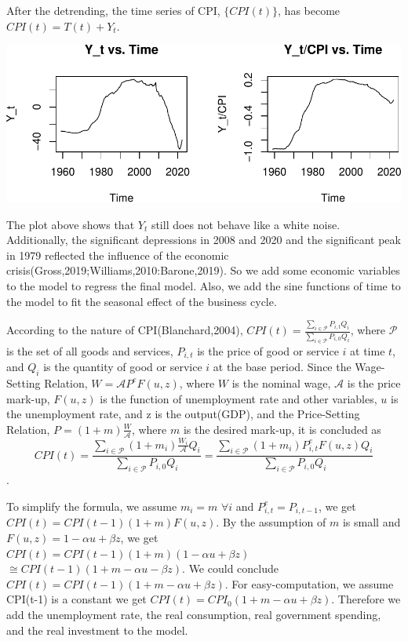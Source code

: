 \documentclass[
  man,floatsintext,
  man]{apa6}
\begin{document}
After the detrending, the time series of CPI, \(\{CPI(t)\}\), has become \(CPI(t) = T(t) + Y_t\).

\includegraphics{stat429_group2_final_proj_files/figure-latex/unnamed-chunk-2-1.pdf}

The plot above shows that \(Y_t\) still does not behave like a white noise.
Additionally, the significant depressions in 2008 and 2020 and the significant peak in 1979 reflected the influence of the economic crisis(Gross,2019;Williams,2010:Barone,2019).
So we add some economic variables to the model to regress the final model.
Also, we add the sine functions of time to the model to fit the seasonal effect of the business cycle.

According to the nature of CPI(Blanchard,2004), \(CPI(t) = \frac{\sum_{i \in \mathcal{P}} P_{i,t} Q_i}{\sum_{i \in \mathcal{P}} P_{i,0} Q_i}\), where \(\mathcal{P}\) is the set of all goods and services, \(P_{i,t}\) is the price of good or service \(i\) at time \(t\), and \(Q_i\) is the quantity of good or service \(i\) at the base period.
Since the Wage-Setting Relation, \(W = \mathcal{A} P^e F(u,z)\), where \(W\) is the nominal wage, \(\mathcal{A}\) is the price mark-up, \(F(u,z)\) is the function of unemployment rate and other variables, \(u\) is the unemployment rate, and z is the output(GDP), and the Price-Setting Relation, \(P = (1+m)\frac{W}{\mathcal{A}}\), where \(m\) is the desired mark-up,
it is concluded as
\[CPI(t) = \frac{\sum_{i \in \mathcal{P}} (1+m_i) \frac{W_i}{\mathcal{A}} Q_i}{\sum_{i \in \mathcal{P}} P_{i,0} Q_i} = \frac{\sum_{i \in \mathcal{P}} (1+m_i) P_{i,t}^e F(u,z) Q_i}{\sum_{i \in \mathcal{P}} P_{i,0} Q_i}\].

To simplify the formula, we assume \(m_i = m \,\, \forall i\) and \(P_{i,t}^e = P_{i,t-1}\), we get \(CPI(t) = CPI(t-1) (1+m) F(u,z)\).
By the assumption of \(m\) is small and \(F(u,z) = 1 - \alpha u + \beta z\), we get \(CPI(t) = CPI(t-1) (1+m) (1 - \alpha u + \beta z)\) \(\cong CPI(t-1) ( 1 + m - \alpha u - \beta z)\).
We could conclude \(CPI(t)=CPI(t-1)(1 + m - \alpha u + \beta z)\).
For easy-computation, we assume CPI(t-1) is a constant we get \(CPI(t)=CPI_0(1 + m - \alpha u + \beta z)\).
Therefore we add the unemployment rate, the real consumption, real government spending, and the real investment to the model.
\end{document}
